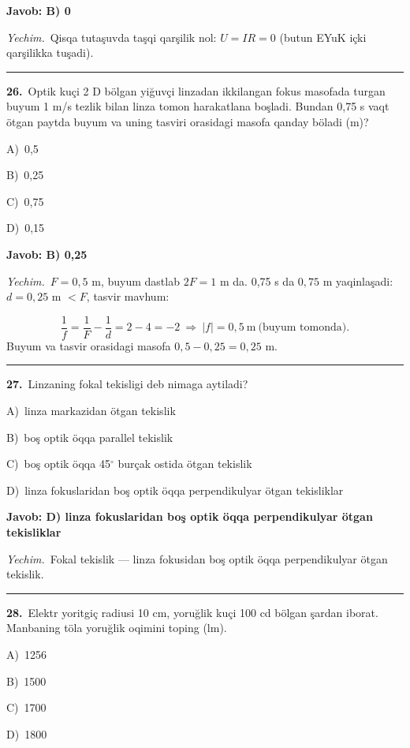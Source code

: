 \documentclass[11pt,a4paper]{article}
\newcommand{\opt}[2]{\hspace*{4mm}#1)\ #2\par}
\begin{document}
\noindent\colorbox{gray!12}{\parbox{\dimexpr\linewidth-2\fboxsep}{\textbf{Javob: B) 0}}}\par\smallskip
\noindent\textit{Yechim.}\ Qisqa tutaşuvda taşqi qarşilik nol: $U=IR=0$ (butun EYuK içki qarşilikka tuşadi).\par\par\medskip\hrule\medskip
{}\noindent\begin{minipage}{\linewidth}
\textbf{26.}\ Optik kuçi 2 D bölgan yiğuvçi linzadan ikkilangan fokus masofada turgan buyum 1 m/s tezlik bilan linza tomon harakatlana boşladi. Bundan 0,75 s vaqt ötgan paytda buyum va uning tasviri orasidagi masofa qanday böladi (m)?\par\smallskip
\opt{A}{0,5}
\opt{B}{0,25}
\opt{C}{0,75}
\opt{D}{0,15}
\end{minipage}\vspace{2pt}\par
\noindent\colorbox{gray!12}{\parbox{\dimexpr\linewidth-2\fboxsep}{\textbf{Javob: B) 0,25}}}\par\smallskip
\noindent\textit{Yechim.}\ $F=0{,}5$ m, buyum dastlab $2F=1$ m da. 0,75 s da $0{,}75$ m yaqinlaşadi: $d=0{,}25$ m $<F$, tasvir mavhum:\par
\[\frac1f=\frac1F-\frac1d=2-4=-2\ \Rightarrow\ |f|=0{,}5\ \text{m}\ \text{(buyum tomonda)}.\]
Buyum va tasvir orasidagi masofa $0{,}5-0{,}25=0{,}25$ m.\par\par\medskip\hrule\medskip
{}\noindent\begin{minipage}{\linewidth}
\textbf{27.}\ Linzaning fokal tekisligi deb nimaga aytiladi?\par\smallskip
\opt{A}{linza markazidan ötgan tekislik}
\opt{B}{boş optik öqqa parallel tekislik}
\opt{C}{boş optik öqqa 45$^\circ$ burçak ostida ötgan tekislik}
\opt{D}{linza fokuslaridan boş optik öqqa perpendikulyar ötgan tekisliklar}
\end{minipage}\vspace{2pt}\par
\noindent\colorbox{gray!12}{\parbox{\dimexpr\linewidth-2\fboxsep}{\textbf{Javob: D) linza fokuslaridan boş optik öqqa perpendikulyar ötgan tekisliklar}}}\par\smallskip
\noindent\textit{Yechim.}\ Fokal tekislik — linza fokusidan boş optik öqqa perpendikulyar ötgan tekislik.\par\par\medskip\hrule\medskip
{}\noindent\begin{minipage}{\linewidth}
\textbf{28.}\ Elektr yoritgiç radiusi 10 cm, yoruğlik kuçi 100 cd bölgan şardan iborat. Manbaning töla yoruğlik oqimini toping (lm).\par\smallskip
\opt{A}{1256}
\opt{B}{1500}
\opt{C}{1700}
\opt{D}{1800}
\end{minipage}\vspace{2pt}\par
\end{document}
